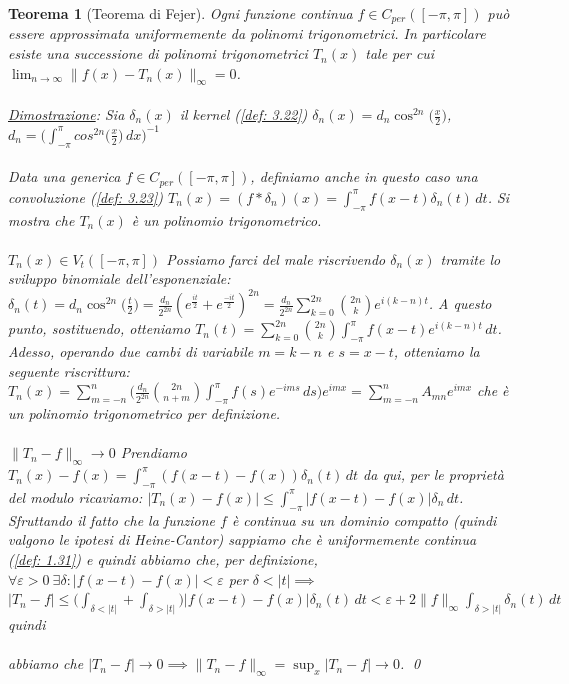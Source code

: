 \documentclass[a4paper,12pt]{report}
\newtheorem{teorema}{Teorema}[chapter]
\newcommand{\lt}{<}
\newcommand{\gt}{>}
\begin{document}
\begin{teorema}[Teorema di Fejer]\label{thm: 3.12}
    Ogni funzione continua $f\in C_{per}([-\pi,\pi])$ può essere approssimata uniformemente da polinomi trigonometrici. In particolare esiste una successione di polinomi trigonometrici $T_n(x)$ tale per cui $\displaystyle\lim_{n\to\infty}\|f(x)-T_n(x)\|_\infty=0$.
    \\
    \\ \underline{Dimostrazione}: Sia $\delta_n(x)$ il kernel (\ref{def: 3.22}) $\delta_n(x)=d_n\displaystyle\cos^{2n}\bigg({\frac{x}{2}}\bigg)$, $d_n=\displaystyle\bigg(\int_{-\pi}^\pi cos^{2n}\bigg({\frac{x}{2}}\bigg)\,dx\bigg)^{-1}$
    \\
    \\Data una generica $f\in C_{per}([-\pi,\pi])$, definiamo anche in questo caso una convoluzione (\ref{def: 3.23}) $T_n(x)=(f*\delta_n)(x)=\displaystyle\int_{-\pi }^\pi f(x-t)\delta_n(t)\,dt$. Si mostra che $T_n(x)$ è un polinomio trigonometrico.
    \\
    \\ $\boxed{T_n(x)\in V_t([-\pi,\pi])}$ Possiamo farci del male riscrivendo $\delta_n(x)$ tramite lo sviluppo binomiale dell'esponenziale: $\delta_n(t)=\displaystyle d_n\cos^{2n}\bigg({\frac{t}{2}}\bigg)=\frac{d_n}{2^{2n}}(e^\frac{it}{2}+e^\frac{-it}{2})^{2n}=\frac{d_n}{2^{2n}}\sum_{k=0}^{2n}\binom{2n}{k}e^{i(k-n)t}$.
    A questo punto, sostituendo, otteniamo $T_n(t)=\displaystyle\sum_{k=0}^{2n}\binom{2n}{k}\int_{-\pi }^\pi f(x-t)e^{i(k-n)t}\,dt$. Adesso, operando due cambi di variabile $m=k-n$ e $s=x-t$, otteniamo la seguente riscrittura:
    \\ $T_n(x)=\displaystyle\sum_{m=-n}^n\bigg(\frac{d_n}{2^{2n}}\binom{2n}{n+m}\int_{-\pi}^\pi f(s)e^{-ims}\,ds\bigg)e^{imx}=\sum_{m=-n}^nA_{mn}e^{imx}$ che è un polinomio trigonometrico per definizione.
    \\
    \\ $\boxed{\|T_n-f\|_\infty\to 0}$ Prendiamo $T_n(x)-f(x)=\displaystyle\int_{-\pi}^\pi(f(x-t)-f(x))\delta_n(t)\,dt$ da qui, per le proprietà del modulo ricaviamo: $|T_n(x)-f(x)|\leq\displaystyle\int_{-\pi}^\pi|f(x-t)-f(x)|\delta_n \,dt$. Sfruttando il fatto che la funzione $f$ è continua su un dominio compatto (quindi valgono le ipotesi di Heine-Cantor) sappiamo che è uniformemente continua (\ref{def: 1.31}) e quindi abbiamo che, per definizione, $\forall \varepsilon\gt 0\ \exists\delta: |f(x-t)-f(x)|\lt \varepsilon $ per $\delta\lt |t|\implies $
    \\$|T_n-f|\leq \displaystyle\bigg(\int_{\delta\lt |t|}+\int_{\delta \gt |t|}\bigg)|f(x-t)-f(x)|\delta_n(t)\,dt\lt \varepsilon+2\|f\|_\infty\int_{\delta\gt|t|}\delta_n(t)\,dt$ quindi 
    \\
    \\abbiamo che $\displaystyle|T_n-f|\to 0\implies \|T_n-f\|_\infty=\sup_x|T_n-f|\to 0$. \qed
    
    
\end{teorema}
\end{document}
